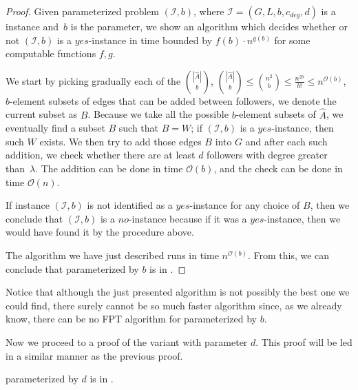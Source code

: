 \begin{proof}
    Given parameterized problem $(\mathcal{I}, b)$, where $\mathcal{I} = (G, L, b, c_{deg}, d)$ is a \HLdeg instance
    and~$b$ is the parameter,
    we show an algorithm which decides whether or not $(\mathcal{I}, b)$ is a $yes$-instance in time bounded by
    $f(b) \cdot n^{g(b)}$ for some computable functions $f,g$.

    We start by picking gradually each of the $\binom{|\hat{A}|}{b}$,
    $\binom{|\hat{A}|}{b} \leq \binom{n^2}{b} \leq \frac{n^{2b}}{b!} \leq n^{\mathcal{O}(b)}$,
    $b$-element subsets of edges that can be added between followers, we denote the current subset as $B$.
    Because we take all the possible $b$-element subsets of $\hat{A}$,
    we eventually find a subset $B$ such that $B = W$;
    if $(\mathcal{I}, b)$ is a $yes$-instance, then such $W$ exists.
    We then try to add those edges $B$ into $G$ and after each such addition,
    we check whether there are at least $d$ followers
    with degree greater than~$\lambda$.
    The addition can be done in time $\mathcal{O}(b)$, and the check can be done in time $\mathcal{O}(n)$.

    If instance $(\mathcal{I}, b)$ is not identified as a $yes$-instance for any choice of $B$,
    then we conclude that $(\mathcal{I}, b)$ is a $no$-instance because if it was a $yes$-instance,
    then we would have found it by the procedure above.

    The algorithm we have just described runs in time $n^{\mathcal{O}(b)}$.
    From this, we can conclude that \HL parameterized by $b$ is in \XP.
\end{proof}

Notice that although the just presented algorithm is not possibly the best one we could find,
there surely cannot be so much faster algorithm since, as we already know,
there can be no FPT algorithm for \HL parameterized by $b$.


Now we proceed to a proof of the variant with parameter $d$.
This proof will be led in a similar manner as the previous proof.

\begin{theorem}\label{theorem:D:XP}
    \HL parameterized by $d$ is in \XP.
\end{theorem}

